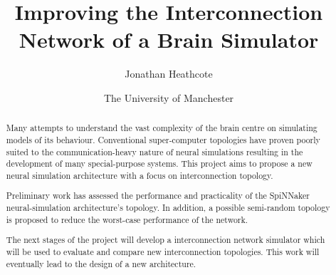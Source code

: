 \documentclass[a4paper,12pt,titlepage]{report}
\title{Improving the Interconnection Network of a Brain Simulator}
\author{Jonathan Heathcote}
\date{The University of Manchester}
\begin{document}
	
	\maketitle
	
	\begin{abstract}
		
		Many attempts to understand the vast complexity of the brain centre on
		simulating models of its behaviour. Conventional super-computer topologies
		have proven poorly suited to the communication-heavy nature of neural
		simulations resulting in the development of many special-purpose systems.
		This project aims to propose a new neural simulation architecture with a
		focus on interconnection topology.
		
		Preliminary work has assessed the performance and practicality of the
		SpiNNaker neural-simulation architecture's topology. In addition, a possible
		semi-random topology is proposed to reduce the worst-case performance of the
		network.
		
		The next stages of the project will develop a interconnection network
		simulator which will be used to evaluate and compare new interconnection
		topologies. This work will eventually lead to the design of a new
		architecture.
		
	\end{abstract}
	
	\tableofcontents
	\listoffigures
	
	
	
	
	
	
	
	
	
	
\end{document}
